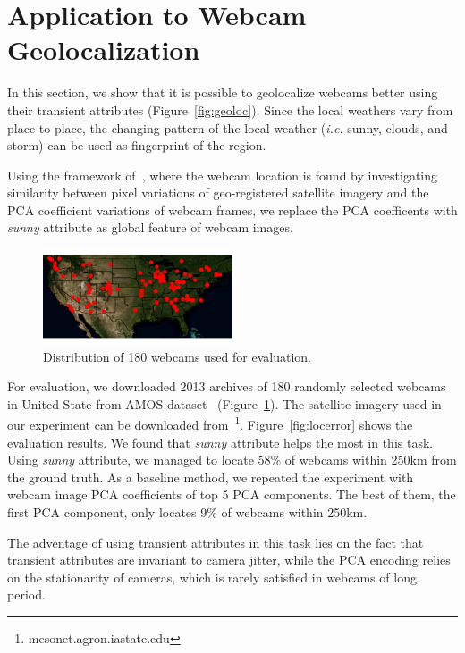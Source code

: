 \documentclass[10pt,twocolumn,letterpaper]{article}
\newcommand{\figref}[1]{Figure~\ref{fig:#1}}
\begin{document}
\section{Application to Webcam Geolocalization}

In this section, we show that it is possible to geolocalize webcams
better using their transient attributes (\figref{geoloc}). Since the
local weathers vary from place to place, the changing pattern of the
local weather (\textit{i.e.} sunny, clouds, and storm) can be used as
fingerprint of the region.

Using the framework of~\cite{jacobs07geolocate}, where the webcam
location is found by investigating similarity between pixel variations
of geo-registered satellite imagery and the PCA coefficient variations
of webcam frames, we replace the PCA coefficents with \textit{sunny}
attribute as global feature of webcam images.

\begin{figure}
	\centering
		\includegraphics[width=0.5\textwidth, trim= 0mm 0mm 0mm 0mm]{figs/geoloc/webcam_dist}
		\caption{Distribution of 180 webcams used for evaluation.}
		\label{fig:webcamdist}
\end{figure}

For evaluation, we downloaded 2013 archives of 180 randomly selected
webcams in United State from AMOS dataset~\cite{jacobs07amos}
(\figref{webcamdist}). The satellite imagery used in our experiment
can be downloaded
from~\footnote{mesonet.agron.iastate.edu}. \figref{locerror} shows the
evaluation results. We found that \textit{sunny} attribute helps the
most in this task. Using \textit{sunny} attribute, we managed to
locate 58\% of webcams within 250km from the ground truth. As a
baseline method, we repeated the experiment with webcam image PCA
coefficients of top 5 PCA components. The best of them, the first PCA
component, only locates 9\% of webcams within 250km.

The adventage of using transient attributes in this task lies on the
fact that transient attributes are invariant to camera jitter, while
the PCA encoding relies on the stationarity of cameras, which is
rarely satisfied in webcams of long period.
\end{document}
